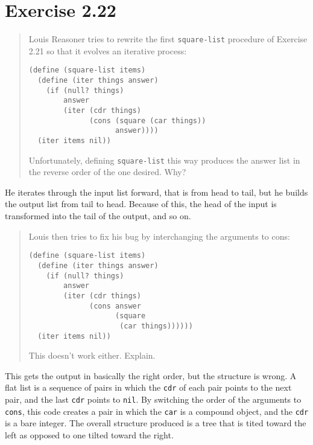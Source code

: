 \documentclass{article}
\begin{document}



\section{Exercise 2.22}
\begin{quote}
    Louis Reasoner tries to rewrite the first \texttt{square-list} procedure of
    Exercise 2.21 so that it evolves an iterative process:
    \begin{lstlisting}
(define (square-list items)
  (define (iter things answer)
    (if (null? things)
        answer
        (iter (cdr things)
              (cons (square (car things))
                    answer))))
  (iter items nil))
    \end{lstlisting}
    Unfortunately, defining \texttt{square-list} this way produces the answer
    list in the reverse order of the one desired. Why?
\end{quote}

He iterates through the input list forward, that is from head to tail, but he
builds the output list from tail to head. Because of this, the head of the
input is transformed into the tail of the output, and so on.

\begin{quote}
    Louis then tries to fix his bug by interchanging the arguments to cons:
    \begin{lstlisting}
(define (square-list items)
  (define (iter things answer)
    (if (null? things)
        answer
        (iter (cdr things)
              (cons answer
                    (square
                     (car things))))))
  (iter items nil))
    \end{lstlisting}
This doesn’t work either. Explain.
\end{quote}

This gets the output in basically the right order, but the structure is wrong. A
flat list is a sequence of pairs in which the \texttt{cdr} of each pair points
to the next pair, and the last \texttt{cdr} points to \texttt{nil}. By switching
the order of the arguments to \texttt{cons}, this code creates a pair in which
the \texttt{car} is a compound object, and the \texttt{cdr} is a bare integer.
The overall structure produced is a tree that is tited toward the left as
opposed to one tilted toward the right.
\end{document}
